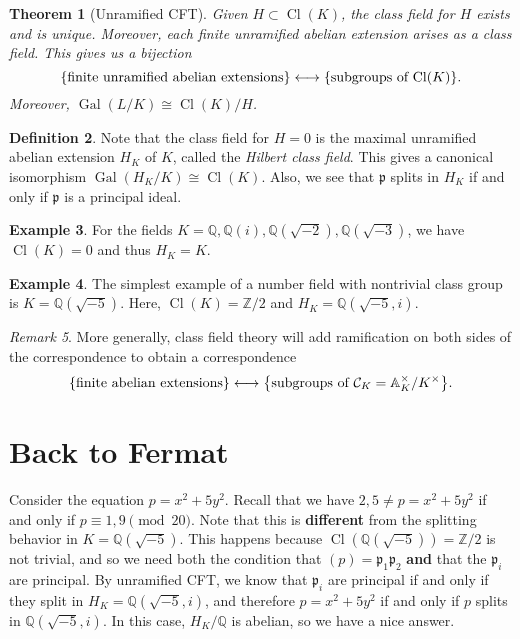 \documentclass[leqno, openany]{memoir}
\newtheorem{thm}{Theorem}[section]
\theoremstyle{definition}
\newtheorem{defn}[thm]{Definition}
\newtheorem{exm}[thm]{Example}
\theoremstyle{remark}
\newtheorem{rmk}[thm]{Remark}
\theoremstyle{plain}
\theoremstyle{definition}
\theoremstyle{remark}
\newcommand{\A}{\mathbb{A}}
\newcommand{\Z}{\mathbb{Z}}
\newcommand{\Q}{\mathbb{Q}}
\newcommand{\mc}[1]{\mathcal{#1}}
\newcommand{\mf}[1]{\mathfrak{#1}}
\DeclareMathOperator{\Gal}{Gal}
\DeclareMathOperator{\Cl}{Cl}
\begin{document}
\begin{thm}[Unramified CFT] Given $H \subset \Cl(K)$, the class field for $H$
    exists and is unique. Moreover, each finite unramified abelian extension
    arises as a class field. This gives us a bijection \[ \qty{\text{finite
    unramified abelian extensions}} \longleftrightarrow \qty{\text{subgroups of
    $\Cl(K)$}}. \] Moreover, $\Gal(L/K) \cong \Cl(K) / H$.  \end{thm}

\begin{defn} Note that the class field for $H = 0$ is the maximal unramified
    abelian extension $H_K$ of $K$, called the \textit{Hilbert class field}.
    This gives a canonical isomorphism $\Gal(H_K/K) \cong \Cl(K)$. Also, we see
    that $\mf{p}$ splits in $H_K$ if and only if $\mf{p}$ is a principal ideal.
\end{defn}

\begin{exm} For the fields $K = \Q, \Q(i), \Q(\sqrt{-2}), \Q(\sqrt{-3})$, we
have $\Cl(K) = 0$ and thus $H_K = K$.  \end{exm}

\begin{exm} The simplest example of a number field with nontrivial class group
is $K = \Q(\sqrt{-5})$. Here, $\Cl(K) = \Z/2$ and $H_K = \Q(\sqrt{-5}, i)$.
\end{exm}

\begin{rmk} More generally, class field theory will add ramification on both
    sides of the correspondence to obtain a correspondence \[ \qty{\text{finite
    abelian extensions}} \longleftrightarrow \qty{\text{subgroups of $\mc{C}_K
    = \A_K^{\times}/K^{\times}$}}. \] \end{rmk}

\section{Back to Fermat}%

Consider the equation $p = x^2 + 5y^2$. Recall that we have $2,5 \neq p = x^2 +
5y^2$ if and only if $p \equiv 1,9 \pmod 20$. Note that this is
\textbf{different} from the splitting behavior in $K = \Q(\sqrt{-5})$. This
happens because $\Cl(\Q(\sqrt{-5})) = \Z/2$ is not trivial, and so we need both
the condition that $(p) = \mf{p}_1 \mf{p}_2$ \textbf{and} that the $\mf{p} _i$
are principal. By unramified CFT, we know that $\mf{p}_i$ are principal if and
only if they split in $H_K = \Q(\sqrt{-5}, i)$, and therefore $p = x^2 + 5y^2$
if and only if $p$ splits in $\Q(\sqrt{-5}, i)$. In this case, $H_K/\Q$ is
abelian, so we have a nice answer.
\end{document}
